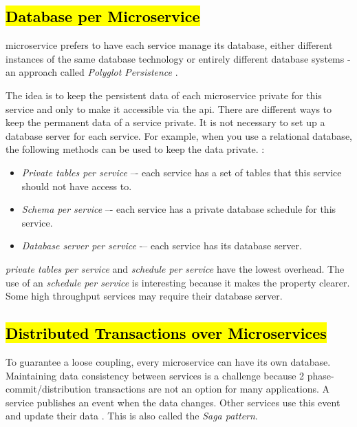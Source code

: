 \subsection{\hl{Database per Microservice}}
\label{subse:database_per_service}

\acrshort{microservice} prefers to have each service manage its database, either different instances of the same database technology or entirely different database systems - an approach called \emph{Polyglot Persistence} \cite{LewisMicroservicesManagement}.

The idea is to keep the persistent data of each microservice private for this service and only to make it accessible via the \acrshort{api}.
There are different ways to keep the permanent data of a service private. It is not necessary to set up a database server for each service. For example, when you use a relational database, the following methods can be used to keep the data private. \cite{RichardsonMicroservicesService}:
\begin{itemize}
    \item \emph{Private tables per service} –- each service has a set of tables that this service should not have access to.
    \item \emph{Schema per service} –- each service has a private database schedule for this service.
    \item \emph{Database server per service} -– each service has its database server.
\end{itemize}
\emph{private tables per service} and \emph{schedule per service} have the lowest overhead. The use of an \emph{schedule per service} is interesting because it makes the property clearer. Some high throughput services may require their database server.

\subsection{\hl{Distributed Transactions over Microservices}}
\label{subse:sagas}
To guarantee a loose coupling, every microservice can have its own database. Maintaining data consistency between services is a challenge because 2 phase-commit/distribution transactions are not an option for many applications. A service publishes an event when the data changes. Other services use this event and update their data \cite{RichardsonMicroservicesSagas}. This is also called the \emph{Saga pattern}.

